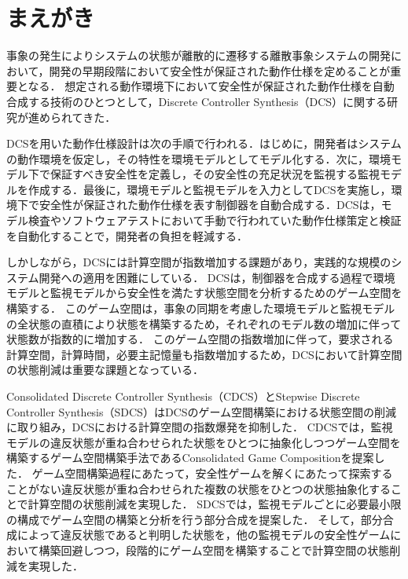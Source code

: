 \section{まえがき}
\label{section:introduction}
事象の発生によりシステムの状態が離散的に遷移する離散事象システムの開発において，開発の早期段階において安全性が保証された動作仕様を定めることが重要となる．
想定される動作環境下において安全性が保証された動作仕様を自動合成する技術のひとつとして，Discrete Controller Synthesis（DCS）\cite{paper:SupervisoryControl}に関する研究が進められてきた．

DCSを用いた動作仕様設計は次の手順で行われる．はじめに，開発者はシステムの動作環境を仮定し，その特性を環境モデルとしてモデル化する．次に，環境モデル下で保証すべき安全性を定義し，その安全性の充足状況を監視する監視モデルを作成する．最後に，環境モデルと監視モデルを入力としてDCSを実施し，環境下で安全性が保証された動作仕様を表す制御器を自動合成する．DCSは，モデル検査やソフトウェアテストにおいて手動で行われていた動作仕様策定と検証を自動化することで，開発者の負担を軽減する．

しかしながら，DCSには計算空間が指数増加する課題があり，実践的な規模のシステム開発への適用を困難にしている．
DCSは，制御器を合成する過程で環境モデルと監視モデルから安全性を満たす状態空間を分析するためのゲーム空間を構築する．
このゲーム空間は，事象の同期を考慮した環境モデルと監視モデルの全状態の直積により状態を構築するため，それぞれのモデル数の増加に伴って状態数が指数的に増加する．
このゲーム空間の指数増加に伴って，要求される計算空間，計算時間，必要主記憶量も指数増加するため，DCSにおいて計算空間の状態削減は重要な課題となっている．

Consolidated Discrete Controller Synthesis（CDCS）\cite{yamauchi:IPSJ2024}とStepwise Discrete Controller Synthesis（SDCS）\cite{yamauchi:IEICEJ2023}はDCSのゲーム空間構築における状態空間の削減に取り組み，DCSにおける計算空間の指数爆発を抑制した．
CDCS\cite{yamauchi:IPSJ2024}では，監視モデルの違反状態が重ね合わせられた状態をひとつに抽象化しつつゲーム空間を構築するゲーム空間構築手法であるConsolidated Game Compositionを提案した．
ゲーム空間構築過程にあたって，安全性ゲームを解くにあたって探索することがない違反状態が重ね合わせられた複数の状態をひとつの状態抽象化することで計算空間の状態削減を実現した．
SDCS\cite{yamauchi:IEICEJ2023}では，監視モデルごとに必要最小限の構成でゲーム空間の構築と分析を行う部分合成を提案した．
そして，部分合成によって違反状態であると判明した状態を，他の監視モデルの安全性ゲームにおいて構築回避しつつ，段階的にゲーム空間を構築することで計算空間の状態削減を実現した．

